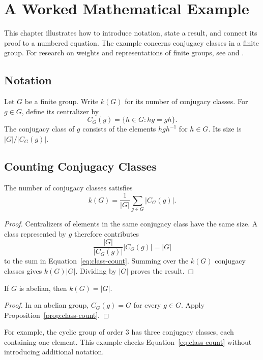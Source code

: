 \chapter{A Worked Mathematical Example}
\label{chap:worked-example}


This chapter illustrates how to introduce notation, state a result, and connect
its proof to a numbered equation. The example concerns conjugacy classes in a
finite group. For research on weights and representations of finite groups,
see \citet{alperin1987weights} and \citet{knorr1989some}.


\section{Notation}
\label{sec:group-notation}
Let $G$ be a finite group. Write $k(G)$ for its number of conjugacy classes.
For $g \in G$, define its centralizer by
\[
  C_G(g) = \{h \in G : hg = gh\}.
\]
The conjugacy class of $g$ consists of the elements $hgh^{-1}$ for $h \in G$.
Its size is $|G| / |C_G(g)|$.


\section{Counting Conjugacy Classes}
\label{sec:conjugacy-classes}
\begin{prop}
  \label{prop:class-count}
  The number of conjugacy classes satisfies
  \begin{equation}
    \label{eq:class-count}
    k(G) = \frac{1}{|G|} \sum_{g \in G} |C_G(g)|.
  \end{equation}
\end{prop}
\begin{proof}
  Centralizers of elements in the same conjugacy class have the same size.
  A class represented by $g$ therefore contributes
  \[
    \frac{|G|}{|C_G(g)|} |C_G(g)| = |G|
  \]
  to the sum in Equation~\eqref{eq:class-count}. Summing over the $k(G)$
  conjugacy classes gives $k(G) |G|$. Dividing by $|G|$ proves the result.
\end{proof}
\begin{corollary}
  If $G$ is abelian, then $k(G) = |G|$.
\end{corollary}
\begin{proof}
  In an abelian group, $C_G(g) = G$ for every $g \in G$. Apply
  Proposition~\ref{prop:class-count}.
\end{proof}


For example, the cyclic group of order 3 has three conjugacy classes, each
containing one element. This example checks Equation~\eqref{eq:class-count}
without introducing additional notation.
